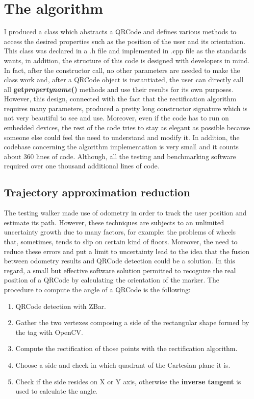 \chapter{The algorithm}

I produced a class which abstracts a QRCode and defines various methods to access the desired properties such as the position of the user and its orientation. This class was declared in a .h file and implemented in .cpp file as the standards wants, in addition, the structure of this code is designed with developers in mind. In fact, after the constructor call, no other parameters are needed to make the class work and, after a QRCode object is instantiated, the user can directly call all \textbf{get\textunderscore{}\emph{propertyname}()} methods and use their results for its own purposes. However, this design, connected with the fact that the rectification algorithm requires many parameters, produced a pretty long constructor signature which is not very beautiful to see and use. Moreover, even if the code has to run on embedded devices, the rest of the code tries to stay as elegant as possible because someone else could feel the need to understand and modify it.
In addition, the codebase concerning the algorithm implementation is very small and it counts about 360 lines of code. Although, all the testing and benchmarking software required over one thousand additional lines of code.

\section{Trajectory approximation reduction}
The testing walker made use of odometry in order to track the user position and estimate its path. However, these techniques are subjects to an unlimited uncertainty growth due to many factors, for example: the problems of wheels that, sometimes, tends to slip on certain kind of floors. Moreover, the need to reduce these errors and put a limit to uncertainty lead to the idea that the fusion between odometry results and QRCode detection could be a solution. In this regard, a small but effective software solution permitted to recognize the real position of a QRCode by calculating the orientation of the marker.
The procedure to compute the angle of a QRCode is the following:
\begin{enumerate}
	\item QRCode detection with ZBar.
	\item Gather the two vertexes composing a side of the rectangular shape formed by the tag with OpenCV.
	\item Compute the rectification of those points with the rectification algorithm.
	\item Choose a side and check in which quadrant of the Cartesian plane it is.
	\item Check if the side resides on X or Y axis, otherwise the \textbf{inverse tangent} is used to calculate the angle.   
\end{enumerate}

